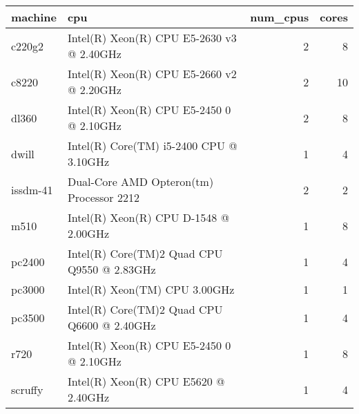 \begin{tabular}{llrr}
\toprule
                                      machine &                                              cpu &  num\_cpus &  cores \\
\midrule
   c220g2 &        Intel(R) Xeon(R) CPU E5-2630 v3 @ 2.40GHz &         2 &      8 \\
 c8220 &        Intel(R) Xeon(R) CPU E5-2660 v2 @ 2.20GHz &         2 &     10 \\
 dl360 &         Intel(R) Xeon(R) CPU E5-2450 0 @ 2.10GHz &         2 &      8 \\
                                        dwill &          Intel(R) Core(TM) i5-2400 CPU @ 3.10GHz &         1 &      4 \\
                                     issdm-41 &         Dual-Core AMD Opteron(tm) Processor 2212 &         2 &      2 \\
     m510 &            Intel(R) Xeon(R) CPU D-1548 @ 2.00GHz &         1 &      8 \\
       pc2400 &  Intel(R) Core(TM)2 Quad CPU    Q9550  @ 2.83GHz &         1 &      4 \\
             pc3000 &                    Intel(R) Xeon(TM) CPU 3.00GHz &         1 &      1 \\
       pc3500 &  Intel(R) Core(TM)2 Quad CPU    Q6600  @ 2.40GHz &         1 &      4 \\
       r720 &         Intel(R) Xeon(R) CPU E5-2450 0 @ 2.10GHz &         1 &      8 \\
                                      scruffy &  Intel(R) Xeon(R) CPU           E5620  @ 2.40GHz &         1 &      4 \\
\bottomrule
\end{tabular}
